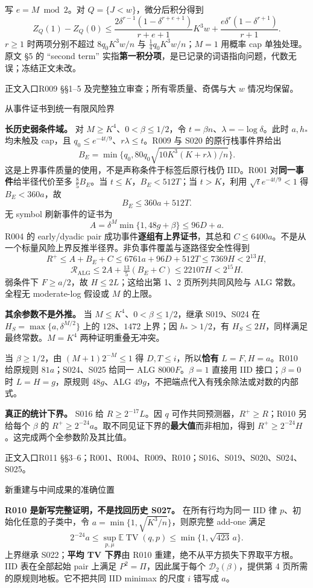 \documentclass[11pt,a4paper]{article}
\newcommand{\TV}{\operatorname{TV}}\newcommand{\E}{\mathbb E}\newcommand{\Prob}{\mathbb P}
\newcommand{\head}[2]{{\small\sffamily #1}\par\vspace{2pt}{\LARGE\bfseries #2}\par\vspace{5pt}}
\newcommand{\entry}[1]{\vfill{\noindent\small\raggedright 正文入口\quad #1\par}}
\begin{document}
写 $e=M\bmod2$。对 $Q=\{J<w\}$，微分后积分得到
\[
 Z_Q(1)-Z_Q(0)\le
 \frac{2\delta^{r-1}(1-\delta^{r+e+1})}{r+e+1}K^3w
 +\frac{e\delta^r(1-\delta^{r+1})}{r+1}.
\]
$r\ge1$ 时两项分别不超过 $8q_0K^3w/n$ 与 $\tfrac14q_0K^3w/n$；$M=1$ 用概率 cap 单独处理。原文 §5 的 ``second term'' 实指\textbf{第一积分项}，是已记录的词语指向问题，代数无误；冻结正文未改。
\entry{R009 §§1--5 及完整独立审查；所有零质量、奇偶与大 $w$ 情况均保留。}
\newpage
\head{从事件证书到统一有限风险界}{全部参数域如何拼合}
\textbf{长历史弱条件域。} 对 $M\ge K^4$、$0<\beta\le1/2$，令
$t=\beta n$、$\lambda=-\log\delta$。此时 $a,h_*$ 均未触及 cap，且
$q_0\le e^{-4t/9}$、$r\lambda\le t$。R009 与 S020 的原行栈事件界给出
\[
 B_E=\min\{q_0,80q_0\sqrt{10K^3(K+r\lambda)/n}\}.
\]
这是上界事件质量的使用，不是声称条件于标签后原行栈仍 IID。R001 对\textbf{同一事件}给半径代价至多 $\tfrac85B_E$。当 $t\le K$，$B_E<512T$；当 $t>K$，利用 $\sqrt t e^{-4t/9}<1$ 得 $B_E<360a$，故
\[
 B_E\le360a+512T.
\]
无 symbol 刷新事件的证书为
\[
 A=\delta^M\min\{1,48g+\beta\}\le96D+a.
\]
R004 的 early/dyadic pair 成功事件\textbf{逐组有上界证书}，其总和 $C\le6400a$。不是从一个标量风险上界反推半径界。非负事件覆盖与逐路径安全性得到
\[
 R^+\le A+B_E+C\le6761a+96D+512T\le7369H<2^{13}H,
\]
\[
 \mathcal R_{\mathrm{ALG}}\le2A+\tfrac{13}{5}(B_E+C)
 \le22107H<2^{15}H.
\]
弱条件下 $F\ge a/2$，故 $H\le2L$；这给出第 1、2 页所列共同风险与 ALG 常数。全程无 moderate-log 假设或 $M$ 的上限。

\textbf{其余参数不是外推。} 当 $M\le K^4$、$0<\beta\le1/2$，继承 S019、S024 在 $H_S=\max\{a,\delta^{M/2}\}$ 上的 $128$、$1472$ 上界；因 $h_*>1/2$，有 $H_S\le2H$，同样满足最终常数。$M=K^4$ 两种证明重叠无冲突。

当 $\beta\ge1/2$，由 $(M+1)2^{-M}\le1$ 得 $D,T\le i$，所以\textbf{恰有} $L=F,H=a$。R010 给原规则 $81a$；S024、S025 给同一 ALG $8000F$。$\beta=1$ 直接用 IID 接口；$\beta=0$ 时 $L=H=g$，原规则 $48g$、ALG $49g$，不把端点代入有残余除法或对数的内部式。

\textbf{真正的统计下界。} S016 给 $R\ge2^{-17}L$。因 $q$ 可作共同预测器，$R^+\ge R$；R010 另给每个 $\beta$ 的 $R^+\ge2^{-24}a$。取不同见证下界的\textbf{最大值}而非相加，得到 $R^+\ge2^{-24}H$。这完成两个全参数阶及其比值。
\entry{R011 §§3--6；R001、R004、R009、R010；S016、S019、S020、S024、S025。}
\newpage
\head{新重建与中间成果的准确位置}{原规则地板和吸收子类路径}
\textbf{R010 是新写完整证明，不是找回历史 S027。} 在所有行均为同一 IID 律 $p$、初始化任意的子类中，令 $a=\min\{1,\sqrt{K^3/n}\}$，则原完整 add-one 满足
\[
 2^{-24}a\le\sup_{p,\mu}\E\TV(q,p)\le\min\{1,\sqrt{423}\,a\}.
\]
上界继承 S022；\textbf{平均 TV 下界}由 R010 重建，绝不从平方损失下界取平方根。IID 表在全部起始 pair 上满足 $P^2=\Pi$，因此属于每个 $\mathcal D_2(\beta)$，提供第 4 页所需的原规则地板。它不把共同 IID minimax 的尺度 $i$ 错写成 $a$。
\end{document}
